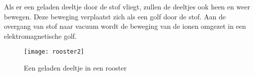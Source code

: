 Als er een geladen deeltje door de stof vliegt, zullen de deeltjes
ook heen en weer bewegen. Deze beweging verplaatst zich als een golf
door de stof. Aan de overgang van stof naar vacuum wordt de beweging
van de ionen omgezet in een elektromagnetische golf.

\begin{figure}[H]
\noindent \begin{centering}
\texttt{[image: rooster2]}
\par\end{centering}

\caption{Een geladen deeltje in een rooster}
\end{figure}


